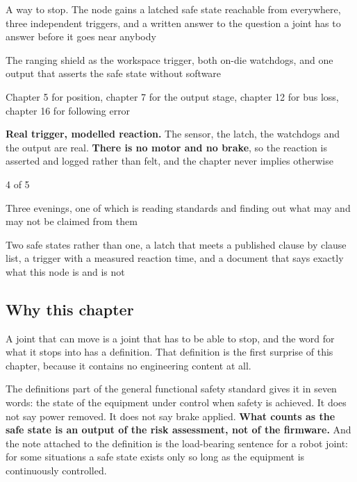 
\begin{keyfacts}
\item[Adds to the node] A way to stop. The node gains a latched safe state
reachable from everywhere, three independent triggers, and a written answer to
the question a joint has to answer before it goes near anybody
\item[Peripherals] The ranging shield as the workspace trigger, both on-die
watchdogs, and one output that asserts the safe state without software
\item[Depends on] Chapter 5 for position, chapter 7 for the output stage,
chapter 12 for bus loss, chapter 16 for following error
\item[Real or modelled] \textbf{Real trigger, modelled reaction.} The sensor,
the latch, the watchdogs and the output are real. \textbf{There is no motor and
no brake}, so the reaction is asserted and logged rather than felt, and the
chapter never implies otherwise
\item[Difficulty] 4 of 5
\item[Effort] Three evenings, one of which is reading standards and finding out
what may and may not be claimed from them
\item[Deliverable] Two safe states rather than one, a latch that meets a
published clause by clause list, a trigger with a measured reaction time, and a
document that says exactly what this node is and is not
\end{keyfacts}

\subsection*{Why this chapter}

A joint that can move is a joint that has to be able to stop, and the word for
what it stops into has a definition. That definition is the first surprise of
this chapter, because it contains no engineering content at all.

The definitions part of the general functional safety standard gives it in
seven words: the state of the equipment under control when safety is achieved.
It does not say power removed. It does not say brake applied. \textbf{What
counts as the safe state is an output of the risk assessment, not of the
firmware.} And the note attached to the definition is the load-bearing sentence
for a robot joint: for some situations a safe state exists only so long as the
equipment is continuously controlled.

